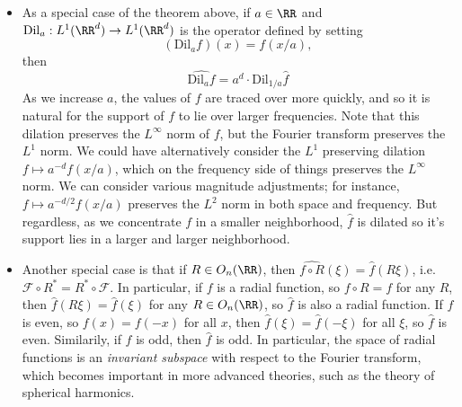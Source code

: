 \begin{itemize}
    \item As a special case of the theorem above, if $a \in \RR$ and $\text{Dil}_a: L^1(\RR^d) \to L^1(\RR^d)$ is the operator defined by setting
    \[ (\text{Dil}_a f)(x) = f(x/a), \]
    then
    \[ \widehat{\text{Dil}_a f} = a^d \cdot \text{Dil}_{1/a} \widehat{f} \]
    As we increase $a$, the values of $f$ are traced over more quickly, and so it is natural for the support of $f$ to lie over larger frequencies. Note that this dilation preserves the $L^\infty$ norm of $f$, but the Fourier transform preserves the $L^1$ norm. We could have alternatively consider the $L^1$ preserving dilation $f \mapsto a^{-d} f(x/a)$, which on the frequency side of things preserves the $L^\infty$ norm. We can consider various magnitude adjustments; for instance, $f \mapsto a^{-d/2} f(x/a)$ preserves the $L^2$ norm in both space and frequency. But regardless, as we concentrate $f$ in a smaller neighborhood, $\widehat{f}$ is dilated so it's support lies in a larger and larger neighborhood.

    \item Another special case is that if $R \in O_n(\RR)$, then $\widehat{f \circ R}(\xi) = \widehat{f}(R \xi)$, i.e. $\mathcal{F} \circ R^* = R^* \circ \mathcal{F}$. In particular, if $f$ is a radial function, so $f \circ R = f$ for any $R$, then $\widehat{f}(R \xi) = \widehat{f}(\xi)$ for any $R \in O_n(\RR)$, so $\widehat{f}$ is also a radial function. If $f$ is even, so $f(x) = f(-x)$ for all $x$, then $\widehat{f}(\xi) = \widehat{f}(-\xi)$ for all $\xi$, so $\widehat{f}$ is even. Similarily, if $f$ is odd, then $\widehat{f}$ is odd. In particular, the space of radial functions is an \emph{invariant subspace} with respect to the Fourier transform, which becomes important in more advanced theories, such as the theory of spherical harmonics.
\end{itemize}


